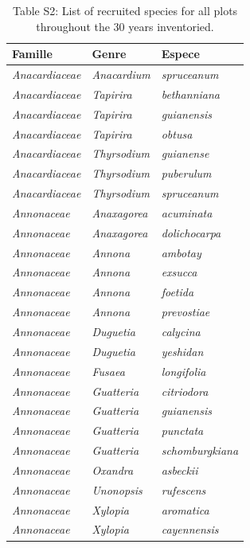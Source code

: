 \documentclass[fleqn,10pt]{ArtEcoFoG} %
\begin{document}
\begin{table}[t]

\caption{\label{tab:Splist}Table S2: List of recruited species for all plots throughout the 30 years inventoried.}
\begin{tabular}{lll}
\toprule
\textbf{Famille} & \textbf{Genre} & \textbf{Espece}\\
\midrule
\em{Anacardiaceae} & \em{Anacardium} & \em{spruceanum}\\
\em{Anacardiaceae} & \em{Tapirira} & \em{bethanniana}\\
\em{Anacardiaceae} & \em{Tapirira} & \em{guianensis}\\
\em{Anacardiaceae} & \em{Tapirira} & \em{obtusa}\\
\em{Anacardiaceae} & \em{Thyrsodium} & \em{guianense}\\
\addlinespace
\em{Anacardiaceae} & \em{Thyrsodium} & \em{puberulum}\\
\em{Anacardiaceae} & \em{Thyrsodium} & \em{spruceanum}\\
\em{Annonaceae} & \em{Anaxagorea} & \em{acuminata}\\
\em{Annonaceae} & \em{Anaxagorea} & \em{dolichocarpa}\\
\em{Annonaceae} & \em{Annona} & \em{ambotay}\\
\addlinespace
\em{Annonaceae} & \em{Annona} & \em{exsucca}\\
\em{Annonaceae} & \em{Annona} & \em{foetida}\\
\em{Annonaceae} & \em{Annona} & \em{prevostiae}\\
\em{Annonaceae} & \em{Duguetia} & \em{calycina}\\
\em{Annonaceae} & \em{Duguetia} & \em{yeshidan}\\
\addlinespace
\em{Annonaceae} & \em{Fusaea} & \em{longifolia}\\
\em{Annonaceae} & \em{Guatteria} & \em{citriodora}\\
\em{Annonaceae} & \em{Guatteria} & \em{guianensis}\\
\em{Annonaceae} & \em{Guatteria} & \em{punctata}\\
\em{Annonaceae} & \em{Guatteria} & \em{schomburgkiana}\\
\addlinespace
\em{Annonaceae} & \em{Oxandra} & \em{asbeckii}\\
\em{Annonaceae} & \em{Unonopsis} & \em{rufescens}\\
\em{Annonaceae} & \em{Xylopia} & \em{aromatica}\\
\em{Annonaceae} & \em{Xylopia} & \em{cayennensis}\\

\end{tabular}
\end{table}
\end{document}
